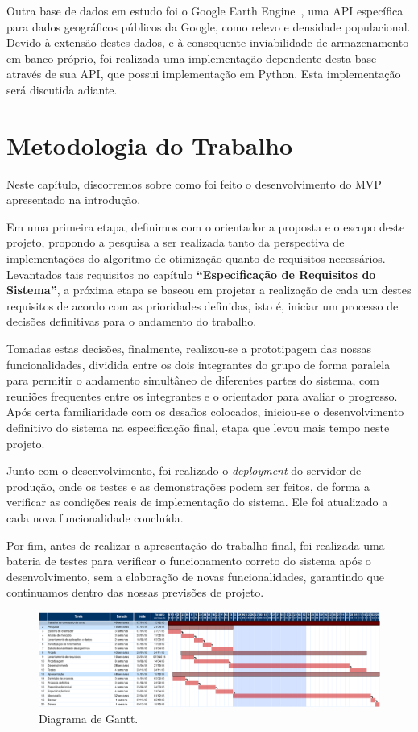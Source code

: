 \documentclass[]{politex}
\begin{document}
Outra base de dados em estudo foi o Google Earth Engine~\cite{earthengine}, uma
API específica para dados geográficos públicos da Google, como relevo e
densidade populacional. Devido à extensão destes dados, e à consequente
inviabilidade de armazenamento em banco próprio, foi realizada uma implementação
dependente desta base através de sua API, que possui implementação em Python.
Esta implementação será discutida adiante.

\chapter{Metodologia do Trabalho}

Neste capítulo, discorremos sobre como foi feito o desenvolvimento do MVP
apresentado na introdução.

Em uma primeira etapa, definimos com o orientador a proposta e o escopo deste
projeto, propondo a pesquisa a ser realizada tanto da perspectiva de
implementações do algoritmo de otimização quanto de requisitos necessários.
Levantados tais requisitos no capítulo \textbf{``Especificação de Requisitos do
Sistema''}, a próxima etapa se baseou em projetar a realização de cada um destes
requisitos de acordo com as prioridades definidas, isto é, iniciar um processo
de decisões definitivas para o andamento do trabalho.

Tomadas estas decisões, finalmente, realizou-se a prototipagem das nossas
funcionalidades, dividida entre os dois integrantes do grupo de forma paralela
para permitir o andamento simultâneo de diferentes partes do sistema, com
reuniões frequentes entre os integrantes e o orientador para avaliar o
progresso. Após certa familiaridade com os desafios colocados, iniciou-se o
desenvolvimento definitivo do sistema na especificação final, etapa que levou
mais tempo neste projeto.

Junto com o desenvolvimento, foi realizado o \textit{deployment} do servidor de
produção, onde os testes e as demonstrações podem ser feitos, de forma a
verificar as condições reais de implementação do sistema. Ele foi atualizado a
cada nova funcionalidade concluída.

Por fim, antes de realizar a apresentação do trabalho final, foi realizada uma
bateria de testes para verificar o funcionamento correto do sistema após o
desenvolvimento, sem a elaboração de novas funcionalidades, garantindo que
continuamos dentro das nossas previsões de projeto.

\begin{figure}[H]
    \centering
    \includegraphics[width=6.5in]{imagens/diagrama_gantt}
    \caption{Diagrama de Gantt.}
    \label{fig:gantt}
\end{figure}
\end{document}
